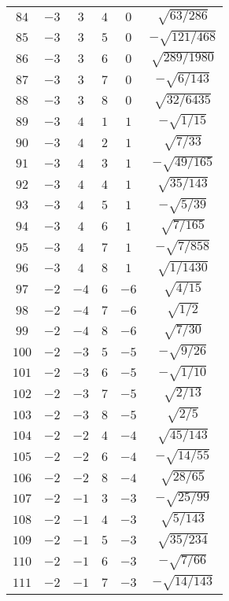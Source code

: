 \begin{table}
\begin{center}
\begin{tabular}{|c|c|c|c|c|c|}
$84$ & $-3$ & $3$ & $4$ & $0$ & $\sqrt{63/286}$ \\ 
$85$ & $-3$ & $3$ & $5$ & $0$ & $-\sqrt{121/468}$ \\ 
$86$ & $-3$ & $3$ & $6$ & $0$ & $\sqrt{289/1980}$ \\ 
$87$ & $-3$ & $3$ & $7$ & $0$ & $-\sqrt{6/143}$ \\ 
$88$ & $-3$ & $3$ & $8$ & $0$ & $\sqrt{32/6435}$ \\ 
$89$ & $-3$ & $4$ & $1$ & $1$ & $-\sqrt{1/15}$ \\ 
$90$ & $-3$ & $4$ & $2$ & $1$ & $\sqrt{7/33}$ \\ 
$91$ & $-3$ & $4$ & $3$ & $1$ & $-\sqrt{49/165}$ \\ 
$92$ & $-3$ & $4$ & $4$ & $1$ & $\sqrt{35/143}$ \\ 
$93$ & $-3$ & $4$ & $5$ & $1$ & $-\sqrt{5/39}$ \\ 
$94$ & $-3$ & $4$ & $6$ & $1$ & $\sqrt{7/165}$ \\ 
$95$ & $-3$ & $4$ & $7$ & $1$ & $-\sqrt{7/858}$ \\ 
$96$ & $-3$ & $4$ & $8$ & $1$ & $\sqrt{1/1430}$ \\ 
$97$ & $-2$ & $-4$ & $6$ & $-6$ & $\sqrt{4/15}$ \\ 
$98$ & $-2$ & $-4$ & $7$ & $-6$ & $\sqrt{1/2}$ \\ 
$99$ & $-2$ & $-4$ & $8$ & $-6$ & $\sqrt{7/30}$ \\ 
$100$ & $-2$ & $-3$ & $5$ & $-5$ & $-\sqrt{9/26}$ \\ 
$101$ & $-2$ & $-3$ & $6$ & $-5$ & $-\sqrt{1/10}$ \\ 
$102$ & $-2$ & $-3$ & $7$ & $-5$ & $\sqrt{2/13}$ \\ 
$103$ & $-2$ & $-3$ & $8$ & $-5$ & $\sqrt{2/5}$ \\ 
$104$ & $-2$ & $-2$ & $4$ & $-4$ & $\sqrt{45/143}$ \\ 
$105$ & $-2$ & $-2$ & $6$ & $-4$ & $-\sqrt{14/55}$ \\ 
$106$ & $-2$ & $-2$ & $8$ & $-4$ & $\sqrt{28/65}$ \\ 
$107$ & $-2$ & $-1$ & $3$ & $-3$ & $-\sqrt{25/99}$ \\ 
$108$ & $-2$ & $-1$ & $4$ & $-3$ & $\sqrt{5/143}$ \\ 
$109$ & $-2$ & $-1$ & $5$ & $-3$ & $\sqrt{35/234}$ \\ 
$110$ & $-2$ & $-1$ & $6$ & $-3$ & $-\sqrt{7/66}$ \\ 
$111$ & $-2$ & $-1$ & $7$ & $-3$ & $-\sqrt{14/143}$ \\ 

\end{tabular}
\end{center}
\end{table}

